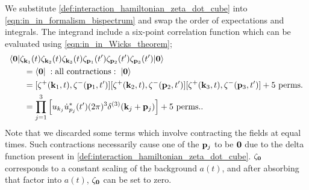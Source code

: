 We substitute \eqref{def:interaction_hamiltonian_zeta_dot_cube} into \eqref{eqn:in_in_formalism_bispectrum} and swap the order of expectations and integrals. The integrand include a six-point correlation function which can be evaluated using \eqref{eqn:in_in_Wicks_theorem};
\begin{align}
	&\langle\vv{0}| \zeta_{\vv{k}_1}(t) \zeta_{\vv{k}_2}(t) \zeta_{\vv{k}_3}(t) \zeta_{\vv{p}_1}(t') \zeta_{\vv{p}_2}(t') \zeta_{\vv{p}_3}(t') |\vv{0}\rangle \nonumber\\
	&\hspace{0.05\textwidth}= \langle\vv{0}| \;: \text{all contractions} :\;|\vv{0}\rangle \\
	&\hspace{0.05\textwidth}= [ \zeta^+(\vv{k}_1,t) , \zeta^-(\vv{p}_1,t') ] [ \zeta^+(\vv{k}_2,t) , \zeta^-(\vv{p}_2,t') ] [ \zeta^+(\vv{k}_3,t) , \zeta^-(\vv{p}_3,t') ] + \text{5 perms.}  \\
	&\hspace{0.05\textwidth}=  \prod_{j=1}^{3} \left[ u_{k_j} \dot{u}^*_{p_j}(t') (2\pi)^3 \delta^{(3)}(\vv{k}_j+\vv{p}_j) \right] + \text{5 perms.}.
\end{align}
Note that we discarded some terms which involve contracting the fields at equal times. Such contractions necessarily cause one of the $\mathbf{p}_j$ to be $\mathbf{0}$ due to the delta function present in \eqref{def:interaction_hamiltonian_zeta_dot_cube}. $\zeta_\mathbf{0}$ corresponds to a constant scaling of the background $a(t)$, and after absorbing that factor into $a(t)$, $\zeta_{\mathbf{0}}$ can be set to zero. 

